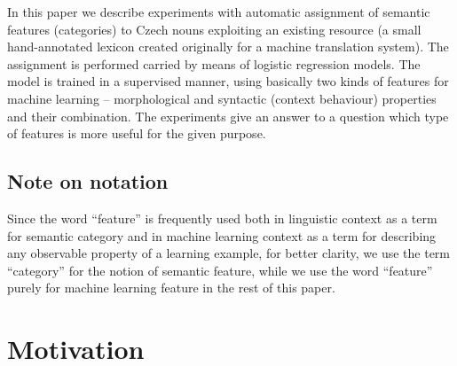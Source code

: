 \documentclass[letterpaper]{article}
\newcommand{\todofn}[1] {
 \footnote{\textbf{TODO : #1}}}
\begin{document}
In this paper we describe experiments with automatic assignment of semantic features (categories) to Czech nouns
exploiting an existing resource (a small hand-annotated lexicon created originally for a machine translation system). The assignment is performed carried by means of logistic regression models. The model is trained in a supervised manner, using 
basically two kinds of features for machine learning --  morphological and syntactic (context behaviour) properties and their combination. The experiments give an answer to a question which type of features is more useful for the given purpose.   




\subsection{Note on notation}
Since the word ``feature'' is frequently used both in linguistic context as a term for semantic category and in 
machine learning context as a term for describing any observable property of a learning example, for 
better clarity, we use the term ``category'' for the notion of semantic feature, 
while we use the word ``feature'' purely for machine learning feature in the rest of this paper.


\section{Motivation}
\end{document}
